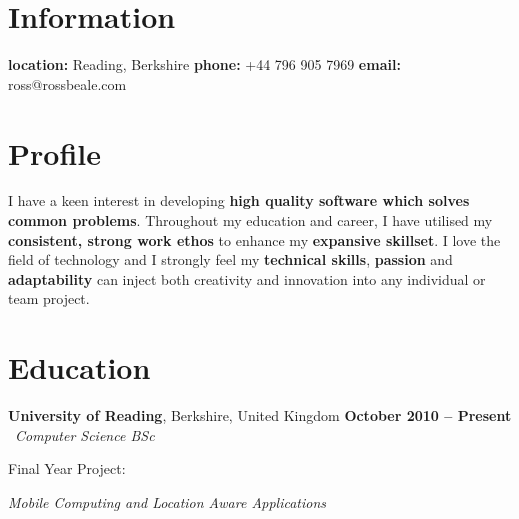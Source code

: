 \documentclass[margin,line,a4paper]{resume}
\begin{document}
\begin{resume}

	

	\section{\mysidestyle Information}

	\textbf{location:} Reading, Berkshire  
	\hfill 
	\textbf{phone:} +44 796 905 7969	 
	\hfill 
	\textbf{email:} ross@rossbeale.com

    	

	\section{\mysidestyle Profile}

	I have a keen interest in developing \textbf{high quality software which solves common problems}. Throughout my education and career, I have utilised my \textbf{consistent, strong work ethos} to enhance my \textbf{expansive skillset}.  I love the field of technology and I strongly feel my \textbf{technical skills}, \textbf{passion} and \textbf{adaptability} can inject both creativity and innovation into any individual or team project.

	

	\section{\mysidestyle Education}

    	\textbf{University of Reading}, Berkshire, United Kingdom	\hfill		\textbf{ October 2010 -- Present} 
	\vspace{2mm}\\\
    	\textsl{Computer Science BSc}\
	\vspace{2mm}\

    	\begin{list2}
	\item Final Year Project:
	\vspace{1mm}%
		\begin{list3}
			\item \textsl{Mobile Computing and Location Aware Applications}\
		\end{list3}
	\vspace{1mm}%


\end{list2}
\end{resume}
\end{document}
